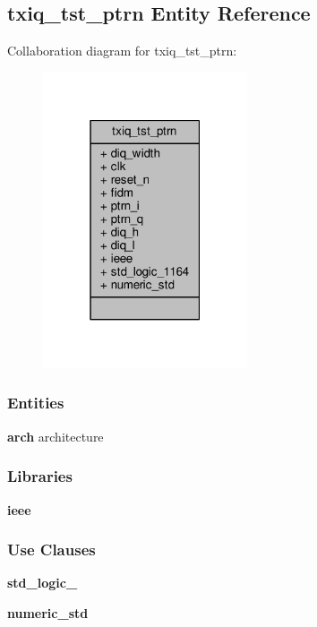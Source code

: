 \subsection{txiq\+\_\+tst\+\_\+ptrn Entity Reference}
\label{classtxiq__tst__ptrn}


Collaboration diagram for txiq\+\_\+tst\+\_\+ptrn\+:\nopagebreak
\begin{figure}[H]
\begin{center}
\leavevmode
\includegraphics[width=171pt]{d1/da1/classtxiq__tst__ptrn__coll__graph}
\end{center}
\end{figure}
\subsubsection*{Entities}
\begin{DoxyCompactItemize}
\item 
{\bf arch} architecture
\end{DoxyCompactItemize}
\subsubsection*{Libraries}
 \begin{DoxyCompactItemize}
\item 
{\bf ieee} 
\end{DoxyCompactItemize}
\subsubsection*{Use Clauses}
 \begin{DoxyCompactItemize}
\item 
{\bf std\+\_\+logic\+\_}   
\item 
{\bf numeric\+\_\+std}   
\end{DoxyCompactItemize}
